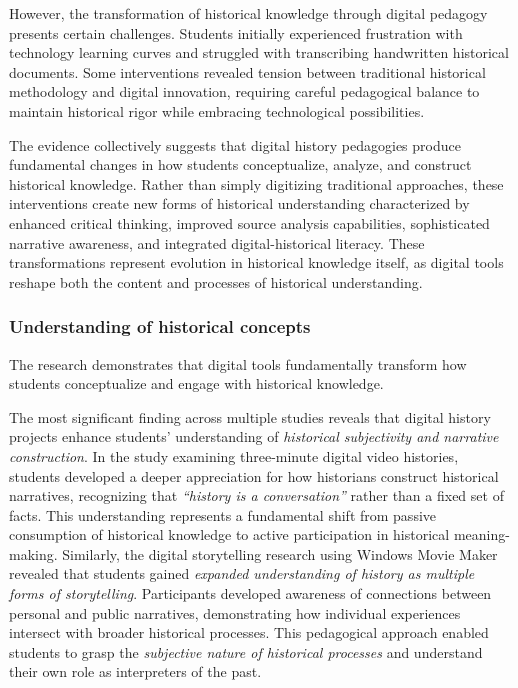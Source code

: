 \documentclass[
hf,
]{ceurart}
\begin{document}
However, the transformation of historical knowledge through digital pedagogy presents certain challenges. Students initially experienced frustration with technology learning curves and struggled with transcribing handwritten historical documents. Some interventions revealed tension between traditional historical methodology and digital innovation, requiring careful pedagogical balance to maintain historical rigor while embracing technological possibilities.

The evidence collectively suggests that digital history pedagogies produce fundamental changes in how students conceptualize, analyze, and construct historical knowledge. Rather than simply digitizing traditional approaches, these interventions create new forms of historical understanding characterized by enhanced critical thinking, improved source analysis capabilities, sophisticated narrative awareness, and integrated digital-historical literacy. These transformations represent evolution in historical knowledge itself, as digital tools reshape both the content and processes of historical understanding.

\subsubsection{Understanding of historical concepts}
The research demonstrates that digital tools fundamentally transform how students conceptualize and engage with historical knowledge.

The most significant finding across multiple studies reveals that digital history projects enhance students' understanding of \textit{historical subjectivity and narrative construction}. In the study examining three-minute digital video histories, students developed a deeper appreciation for how historians construct historical narratives, recognizing that \textit{``history is a conversation''} rather than a fixed set of facts. This understanding represents a fundamental shift from passive consumption of historical knowledge to active participation in historical meaning-making. Similarly, the digital storytelling research using Windows Movie Maker revealed that students gained \textit{expanded understanding of history as multiple forms of storytelling}. Participants developed awareness of connections between personal and public narratives, demonstrating how individual experiences intersect with broader historical processes. This pedagogical approach enabled students to grasp the \textit{subjective nature of historical processes} and understand their own role as interpreters of the past.
\end{document}

